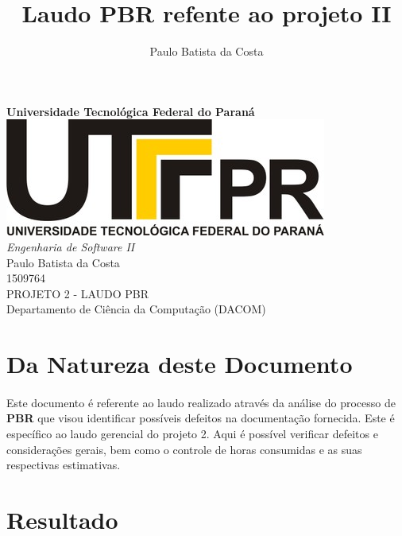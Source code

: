 \documentclass[12pt,a4paper]{article}
\author{Paulo Batista da Costa}
\title{Laudo PBR refente ao projeto II }
\begin{document}
	
        \begin{titlepage}
        \LARGE
        	\begin{center}
        	\vspace{5cm} 
        	\textbf{Universidade Tecnológica Federal do Paraná \\ \vspace{1.8cm}}
        	\includegraphics[scale=0.35]{logoutfpr.jpg} \\ \vspace{1.8cm}
        	\textit{Engenharia de Software II} \vspace{2cm} \\
        	Paulo Batista da Costa \\ 1509764 \vspace{2cm} \\ 
        	PROJETO 2 - LAUDO PBR \vspace{2cm} \\
        	Departamento de Ciência da Computação (DACOM) 
        	
        	\end{center}
        \end{titlepage}	
	
		\tableofcontents
		\newpage
		\section{Da Natureza deste Documento} 
		\paragraph{} 
		Este documento é referente ao laudo realizado através da análise do processo de \textbf{PBR} que visou identificar possíveis defeitos na documentação fornecida. Este é específico ao laudo gerencial do projeto 2. Aqui é possível verificar defeitos e considerações gerais, bem como o controle de horas consumidas e as suas respectivas estimativas.
		
		\section{Resultado}
\end{document}
